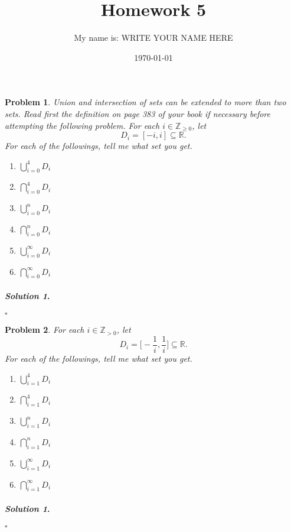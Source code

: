 \documentclass{amsart}
\theoremstyle{plain}
\newtheorem{problem}{Problem}
\newenvironment{solution}{\paragraph{\emph{Solution 1}.}}{\hfill$\square$}
\begin{document}
 

\title[Homework 5]{Homework 5}
\author{My name is:  WRITE YOUR NAME HERE}  %
\date{\today} 
\maketitle 

\begin{problem}
Union and intersection of sets can be extended to more than two sets.  Read first the definition on page 383 of your book if necessary before attempting the following problem.  For each $i \in \mathbb{Z}_{\ge 0}$, let
$$D_{i} = [-i,i] \subseteq \mathbb{R}. $$
For each of the followings, tell me what set you get.
\begin{enumerate}
\item $\bigcup\limits_{i=0}^{4} D_{i}$
\item $\bigcap\limits_{i=0}^{4} D_{i}$
\item $\bigcup\limits_{i=0}^{n} D_{i}$
\item $\bigcap\limits_{i=0}^{n} D_{i}$
\item $\bigcup\limits_{i=0}^{\infty}D_{i}$
\item $\bigcap\limits_{i=0}^{\infty}D_{i}$
\end{enumerate} 
\end{problem}
\begin{solution}
\end{solution}

\begin{problem}
For each $i \in \mathbb{Z}_{> 0}$, let
$$D_{i} = \big[-\frac{1}{i},\frac{1}{i}\big] \subseteq \mathbb{R}. $$
For each of the followings, tell me what set you get.
\begin{enumerate}
\item $\bigcup\limits_{i=1}^{4} D_{i}$
\item $\bigcap\limits_{i=1}^{4} D_{i}$
\item $\bigcup\limits_{i=1}^{n} D_{i}$
\item $\bigcap\limits_{i=1}^{n} D_{i}$
\item $\bigcup\limits_{i=1}^{\infty}D_{i}$
\item $\bigcap\limits_{i=1}^{\infty}D_{i}$
\end{enumerate}
\end{problem}
\begin{solution}
\end{solution}
\end{document}
